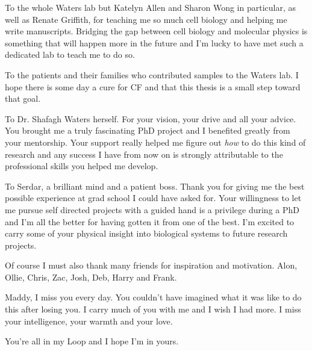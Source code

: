 To the whole Waters lab but Katelyn Allen and Sharon Wong in particular, as well as Renate Griffith, for teaching me so much cell biology and helping me write manuscripts. Bridging the gap between cell biology and molecular physics is something that will happen more in the future and I'm lucky to have met such a dedicated lab to teach me to do so.

To the patients and their families who contributed samples to the Waters lab. I hope there is some day a cure for CF and that this thesis is a small step toward that goal.

To Dr. Shafagh Waters herself. For your vision, your drive and all your advice. You brought me a truly fascinating PhD project and I benefited greatly from your mentorship. Your support really helped me figure out \textit{how} to do this kind of research and any success I have from now on is strongly attributable to the professional skills you helped me develop.

To Serdar, a brilliant mind and a patient boss. Thank you for giving me the best possible experience at grad school I could have asked for. Your willingness to let me pursue self directed projects with a guided hand is a privilege during a PhD and I'm all the better for having gotten it from one of the best. I'm excited to carry some of your physical insight into biological systems to future research projects. 

Of course I must also thank many friends for inspiration and motivation. Alon, Ollie, Chris, Zac, Josh, Deb, Harry and Frank.

Maddy, I miss you every day. You couldn't have imagined what it was like to do this after losing you. I carry much of you with me and I wish I had more. I miss your intelligence, your warmth and your love.

You're all in my Loop and I hope I'm in yours.

